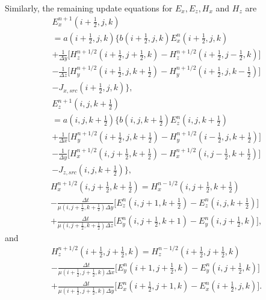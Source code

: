 Similarly, the remaining update equations for $E_x, E_z, H_x$ and $H_z$ are
\begin{multline}
	E_x^{n+1}(i+\tfrac{1}{2},j,k)\\ 
	=a(i+\tfrac{1}{2},j,k) \bigg\{b(i+\tfrac{1}{2},j,k)E_x^{n}(i+\tfrac{1}{2},j,k) \\
	 +\frac{1}{\Delta y}\bigg[H_z^{n+1/2}(i+\tfrac{1}{2},j+\tfrac{1}{2},k)-H_z^{n+1/2}(i+\tfrac{1}{2},j-\tfrac{1}{2},k) \bigg] \\
	 -\frac{1}{\Delta z} \bigg[H_y^{n+1/2}(i+\tfrac{1}{2},j,k+\tfrac{1}{2})-H_y^{n+1/2}(i+\tfrac{1}{2},j,k-\tfrac{1}{2})\bigg] \\
	 -J_{x,src}(i+\tfrac{1}{2},j,k)
	 \bigg\},
	\label{eq:ex-update}
\end{multline}
\begin{multline}
	E_z^{n+1}(i,j,k+\tfrac{1}{2})\\ 
	=a(i,j,k+\tfrac{1}{2}) \bigg\{b(i,j,k+\tfrac{1}{2})E_z^{n}(i,j,k+\tfrac{1}{2}) \\
	 +\frac{1}{\Delta x}\bigg[H_y^{n+1/2}(i+\tfrac{1}{2},j,k+\tfrac{1}{2})-H_y^{n+1/2}(i-\tfrac{1}{2},j,k+\tfrac{1}{2}) \bigg] \\
	 -\frac{1}{\Delta y} \bigg[H_x^{n+1/2}(i,j+\tfrac{1}{2},k+\tfrac{1}{2})-H_x^{n+1/2}(i,j-\tfrac{1}{2},k+\tfrac{1}{2})\bigg] \\
	 -J_{z,src}(i,j,k+\tfrac{1}{2})
	 \bigg\},
	\label{eq:ez-update}
\end{multline}
\begin{multline}
	H_x^{n+1/2}(i,j+\tfrac{1}{2},k+\tfrac{1}{2}) = H_x^{n-1/2}(i,j+\tfrac{1}{2},k+\tfrac{1}{2}) \\ 
	-\frac{\Delta t}{\mu(i,j+\tfrac{1}{2},k+\tfrac{1}{2})\Delta y}\bigg[E_z^n(i,j+1,k+\tfrac{1}{2})-E_z^n(i,j,k+\tfrac{1}{2})\bigg] \\
	+\frac{\Delta t}{\mu(i,j+\tfrac{1}{2},k+\tfrac{1}{2})\Delta z}\bigg[E_y^n(i,j+\tfrac{1}{2},k+1)-E_y^n(i,j+\tfrac{1}{2},k)\bigg],
	\label{eq:hx-update}
\end{multline}
and
\begin{multline}
	H_z^{n+1/2}(i+\tfrac{1}{2},j+\tfrac{1}{2},k) = H_z^{n-1/2}(i+\tfrac{1}{2},j+\tfrac{1}{2},k) \\ 
	-\frac{\Delta t}{\mu(i+\tfrac{1}{2},j+\tfrac{1}{2},k)\Delta x}\bigg[E_y^n(i+1,j+\tfrac{1}{2},k)-E_y^n(i,j+\tfrac{1}{2},k)\bigg] \\
	+\frac{\Delta t}{\mu(i+\tfrac{1}{2},j+\tfrac{1}{2},k)\Delta y}\bigg[E_x^n(i+\tfrac{1}{2},j+1,k)-E_x^n(i+\tfrac{1}{2},j,k)\bigg].
	\label{eq:hz-update}
\end{multline}

